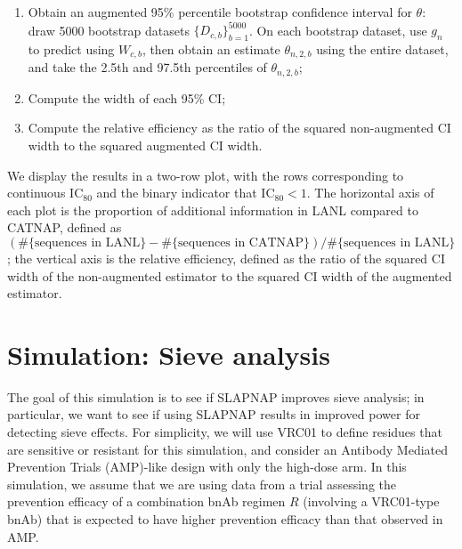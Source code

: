 \documentclass[10pt]{article}
\begin{document}
\begin{enumerate}
\begin{enumerate}
    \item Obtain an augmented 95\% percentile bootstrap confidence interval for $\theta$: draw 5000 bootstrap datasets $\{D_{c,b}\}_{b = 1}^{5000}$. On each bootstrap dataset, use $g_n$ to predict using $W_{c,b}$, then obtain an estimate $\theta_{n,2,b}$ using the entire dataset, and take the 2.5th and 97.5th percentiles of $\theta_{n,2,b}$;
    \item Compute the width of each 95\% CI;
    \item Compute the relative efficiency as the ratio of the squared non-augmented CI width to the squared augmented CI width.
  \end{enumerate}
\end{enumerate}
We display the results in a two-row plot, with the rows corresponding to continuous IC$_{80}$ and the binary indicator that IC$_{80} < 1$. The horizontal axis of each plot is the proportion of additional information in LANL compared to CATNAP, defined as $(\#\{\text{sequences in LANL}\} - \#\{\text{sequences in CATNAP}\}) / \#\{\text{sequences in LANL}\}$; the vertical axis is the relative efficiency, defined as the ratio of the squared CI width of the non-augmented estimator to the squared CI width of the augmented estimator.

\section{Simulation: Sieve analysis}

The goal of this simulation is to see if SLAPNAP improves sieve analysis; in particular, we want to see if using SLAPNAP results in improved power for detecting sieve effects. For simplicity, we will use VRC01 to define residues that are sensitive or resistant for this simulation, and consider an Antibody Mediated Prevention Trials (AMP)-like design with only the high-dose arm. In this simulation, we assume that we are using data from a trial assessing the prevention efficacy of a combination bnAb regimen $R$ (involving a VRC01-type bnAb) that is expected to have higher prevention efficacy than that observed in AMP.
\end{document}
